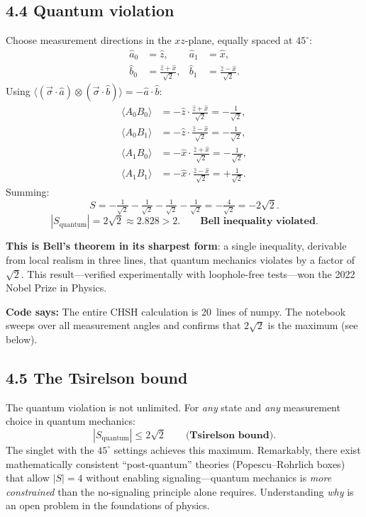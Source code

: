 \documentclass[12pt,a4paper]{article}
\begin{document}
\subsection{4.4 Quantum violation}
Choose measurement directions in the $xz$-plane, equally spaced at $45^\circ$:
\begin{align*}
    \hat{a}_0 &= \hat{z}, & \hat{a}_1 &= \hat{x}, \\
    \hat{b}_0 &= \frac{\hat{z}+\hat{x}}{\sqrt{2}}, & \hat{b}_1 &= \frac{\hat{z}-\hat{x}}{\sqrt{2}}.
\end{align*}
Using $\langle (\vec{\sigma}\cdot\hat{a})\otimes(\vec{\sigma}\cdot\hat{b})\rangle = -\hat{a}\cdot\hat{b}$:
\begin{align*}
    \langle A_0 B_0\rangle &= -\hat{z}\cdot\tfrac{\hat{z}+\hat{x}}{\sqrt{2}} = -\tfrac{1}{\sqrt{2}}, \\
    \langle A_0 B_1\rangle &= -\hat{z}\cdot\tfrac{\hat{z}-\hat{x}}{\sqrt{2}} = -\tfrac{1}{\sqrt{2}}, \\
    \langle A_1 B_0\rangle &= -\hat{x}\cdot\tfrac{\hat{z}+\hat{x}}{\sqrt{2}} = -\tfrac{1}{\sqrt{2}}, \\
    \langle A_1 B_1\rangle &= -\hat{x}\cdot\tfrac{\hat{z}-\hat{x}}{\sqrt{2}} = +\tfrac{1}{\sqrt{2}}.
\end{align*}
Summing:
\[
    S = -\tfrac{1}{\sqrt{2}} -\tfrac{1}{\sqrt{2}} -\tfrac{1}{\sqrt{2}} - \tfrac{1}{\sqrt{2}} = -\tfrac{4}{\sqrt{2}} = -2\sqrt{2}.
\]
\[
    \boxed{|S_{\text{quantum}}| = 2\sqrt{2} \approx 2.828 > 2. \qquad\textbf{Bell inequality violated.}}
\]

\noindent\textbf{This is Bell's theorem in its sharpest form}: a single inequality, derivable from local realism in three lines, that quantum mechanics violates by a factor of $\sqrt{2}$.  This result---verified experimentally with loophole-free tests---won the 2022 Nobel Prize in Physics.

\medskip
\noindent\textbf{Code says:} The entire CHSH calculation is 20~lines of numpy.  The notebook sweeps over all measurement angles and confirms that $2\sqrt{2}$ is the maximum (see below).

\subsection{4.5 The Tsirelson bound}
The quantum violation is not unlimited.  For \emph{any} state and \emph{any} measurement choice in quantum mechanics:
\[
    |S_{\text{quantum}}| \leq 2\sqrt{2} \qquad\textbf{(Tsirelson bound)}.
\]
The singlet with the $45^\circ$ settings achieves this maximum.  Remarkably, there exist mathematically consistent ``post-quantum'' theories (Popescu--Rohrlich boxes) that allow $|S|=4$ without enabling signaling---quantum mechanics is \emph{more constrained} than the no-signaling principle alone requires.  Understanding \emph{why} is an open problem in the foundations of physics.
\end{document}
